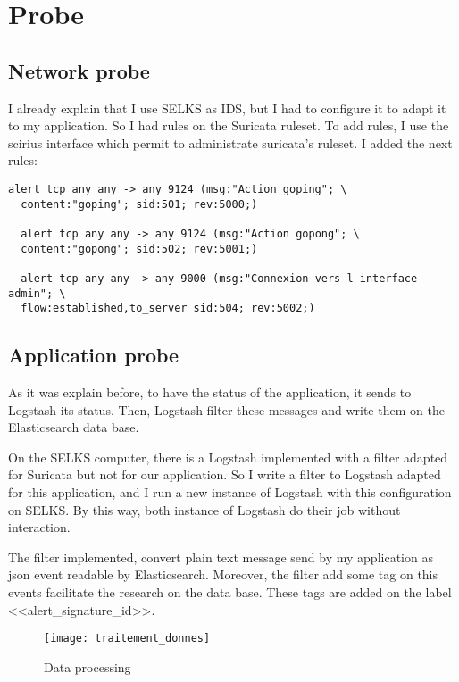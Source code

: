 \section{Probe}

\subsection{Network probe}

I already explain that I use SELKS as IDS, but I had to configure it to adapt it to my application. So I had rules
on the Suricata ruleset. To add rules, I use the scirius interface which permit to administrate suricata's ruleset.
I added the next rules:

\begin{lstlisting}[language=suricata]
  alert tcp any any -> any 9124 (msg:"Action goping"; \
  content:"goping"; sid:501; rev:5000;)

  alert tcp any any -> any 9124 (msg:"Action gopong"; \
  content:"gopong"; sid:502; rev:5001;)

  alert tcp any any -> any 9000 (msg:"Connexion vers l interface admin"; \
  flow:established,to_server sid:504; rev:5002;)
\end{lstlisting}




\subsection{Application probe}

As it was explain before, to have the status of the application, it sends to Logstash its status. Then, Logstash
filter these messages and write them on the Elasticsearch data base.

On the SELKS computer, there is a Logstash implemented with a filter adapted for Suricata but not for our
application. So I write a filter to Logstash adapted for this application, and I run a new instance of Logstash
with this configuration on SELKS. By this way, both instance of Logstash do their job without interaction.

The filter implemented, convert plain text message send by my application as json event readable by Elasticsearch.
Moreover, the filter add some tag on this events facilitate the research on the data base. These tags are added on the
label <<alert\_signature\_id>>.

\begin{figure}[h]
  \centering
  \texttt{[image: traitement\_donnes]}
  \caption{Data processing}
  \label{fig:dataprocessing}
\end{figure}


